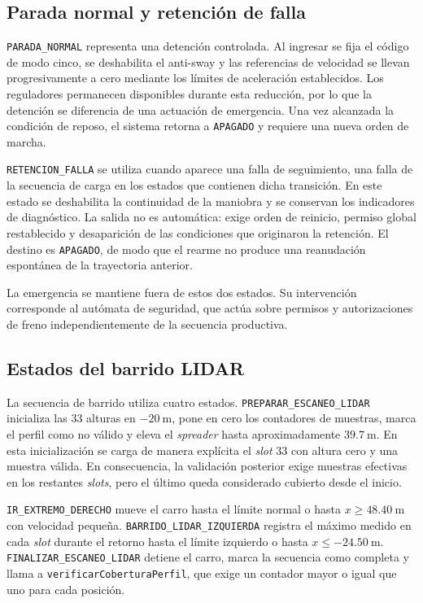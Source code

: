 \documentclass[a4paper,10pt,onecolumn,journal]{ieeeconf}
\numberwithin{equation}{section}
\begin{document}
\subsection{Parada normal y retención de falla}
\texttt{PARADA\_NORMAL} representa una detención controlada. Al ingresar se fija el código de modo cinco, se deshabilita el anti-sway y las referencias de velocidad se llevan progresivamente a cero mediante los límites de aceleración establecidos. Los reguladores permanecen disponibles durante esta reducción, por lo que la detención se diferencia de una actuación de emergencia. Una vez alcanzada la condición de reposo, el sistema retorna a \texttt{APAGADO} y requiere una nueva orden de marcha.

\texttt{RETENCION\_FALLA} se utiliza cuando aparece una falla de seguimiento, una falla de la secuencia de carga en los estados que contienen dicha transición. En este estado se deshabilita la continuidad de la maniobra y se conservan los indicadores de diagnóstico. La salida no es automática: exige orden de reinicio, permiso global restablecido y desaparición de las condiciones que originaron la retención. El destino es \texttt{APAGADO}, de modo que el rearme no produce una reanudación espontánea de la trayectoria anterior.

La emergencia se mantiene fuera de estos dos estados. Su intervención corresponde al autómata de seguridad, que actúa sobre permisos y autorizaciones de freno independientemente de la secuencia productiva.


\subsection{Estados del barrido LIDAR}
La secuencia de barrido utiliza cuatro estados. \texttt{PREPARAR\_ESCANEO\_LIDAR} inicializa las 33 alturas en $-20~\mathrm{m}$, pone en cero los contadores de muestras, marca el perfil como no válido y eleva el \textit{spreader} hasta aproximadamente $39.7~\mathrm{m}$. En esta inicialización se carga de manera explícita el \textit{slot} 33 con altura cero y una muestra válida. En consecuencia, la validación posterior exige muestras efectivas en los restantes \textit{slots}, pero el último queda considerado cubierto desde el inicio.

\texttt{IR\_EXTREMO\_DERECHO} mueve el carro hasta el límite normal o hasta $x\geq48.40~\mathrm{m}$ con velocidad pequeña. \texttt{BARRIDO\_LIDAR\_IZQUIERDA} registra el máximo medido en cada \textit{slot} durante el retorno hasta el límite izquierdo o hasta $x\leq-24.50~\mathrm{m}$. \texttt{FINALIZAR\_ESCANEO\_LIDAR} detiene el carro, marca la secuencia como completa y llama a \texttt{verificarCoberturaPerfil}, que exige un contador mayor o igual que uno para cada posición.
\end{document}
